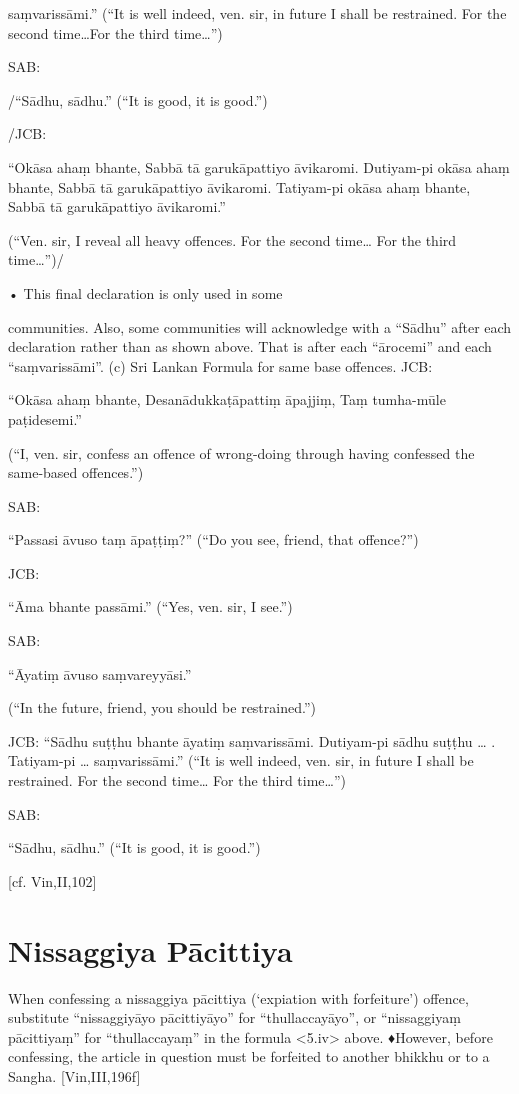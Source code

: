 saṃvarissāmi.”
(“It is well indeed, ven. sir, in future I shall be
restrained. For the second time…For the third time…”)

SAB:

/“Sādhu, sādhu.”
(“It is good, it is good.”)

/JCB:

“Okāsa ahaṃ bhante,
Sabbā tā garukāpattiyo āvikaromi.
Dutiyam-pi okāsa ahaṃ bhante,
Sabbā tā garukāpattiyo āvikaromi.
Tatiyam-pi okāsa ahaṃ bhante,
Sabbā tā garukāpattiyo āvikaromi.”

(“Ven. sir, I reveal all heavy offences. For the second
time… For the third time…”)/

• This final declaration is only used in some

communities. Also, some communities will
acknowledge with a “Sādhu” after each declaration rather than as shown above. That is
after each “ārocemi” and each “saṃvarissāmi”.
(c) Sri Lankan Formula for same base offences.
JCB:

“Okāsa ahaṃ bhante,
Desanādukkaṭāpattiṃ āpajjiṃ,
Taṃ tumha-mūle paṭidesemi.”

(“I, ven. sir, confess an offence of wrong-doing
through having confessed the same-based offences.”)

SAB:

“Passasi āvuso taṃ āpaṭṭiṃ?”
(“Do you see, friend, that offence?”)

JCB:

“Āma bhante passāmi.”
(“Yes, ven. sir, I see.”)

SAB:

“Āyatiṃ āvuso saṃvareyyāsi.”

(“In the future, friend, you should be restrained.”)

JCB: “Sādhu suṭṭhu bhante āyatiṃ saṃvarissāmi.
Dutiyam-pi sādhu suṭṭhu … .
Tatiyam-pi … saṃvarissāmi.”
(“It is well indeed, ven. sir, in future I shall be
restrained. For the second time… For the third time…”)

SAB:

“Sādhu, sādhu.”
(“It is good, it is good.”)

[cf. Vin,II,102]

\section{Nissaggiya Pācittiya}

When confessing a nissaggiya pācittiya (‘expiation with forfeiture’) offence, substitute “nissaggiyāyo pācittiyāyo” for “thullaccayāyo”, or
“nissaggiyaṃ pācittiyaṃ” for “thullaccayaṃ” in
the formula <5.iv> above.
♦However, before confessing, the article in
question must be forfeited to another bhikkhu
or to a Sangha.
[Vin,III,196f]

